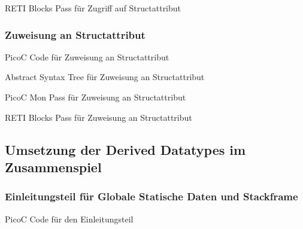\begin{code}
  \centering
  \caption{RETI Blocks Pass für Zugriff auf Structattribut}
  \label{code:reti_blocks_pass_für_zugriff_auf_structattribut}
\end{code}

\subsubsection{Zuweisung an Structattribut}
\begin{code}
  \centering
  \caption{PicoC Code für Zuweisung an Structattribut}
  \label{code:picoc_code_für_zuweisung_an_structattribut}
\end{code}

\begin{code}
  \centering
  \caption{Abstract Syntax Tree für Zuweisung an Structattribut}
  \label{code:abstract_syntax_tree_für_zuweisung_an_structattribut}
\end{code}

\begin{code}
  \centering
  \caption{PicoC Mon Pass für Zuweisung an Structattribut}
  \label{code:picoc_mon_pass_für_zuweisung_an_structattribut}
\end{code}

\begin{code}
  \centering
  \caption{RETI Blocks Pass für Zuweisung an Structattribut}
  \label{code:reti_blocks_pass_für_zuweisung_an_structattribut}
\end{code}

\subsection{Umsetzung der Derived Datatypes im Zusammenspiel}
\subsubsection{Einleitungsteil für Globale Statische Daten und Stackframe}
\begin{code}
  \centering
  \caption{PicoC Code für den Einleitungsteil}
  \label{code:picoc_code_einleitungsteil}
\end{code}

